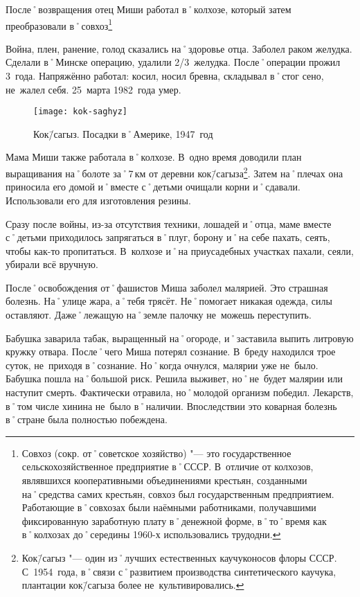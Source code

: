 После˚возвращения отец Миши работал в˚колхозе, который затем преобразовали в˚совхоз\footnote{Совхоз (сокр. от˚советское хозяйство) "--- это государственное сельскохозяйственное предприятие в˚СССР. В~отличие от колхозов, являвшихся кооперативными объединениями крестьян, созданными на˚средства самих крестьян, совхоз был государственным предприятием. Работающие в˚совхозах были наёмными работниками, получавшими фиксированную заработную плату в˚денежной форме, в˚то˚время как в˚колхозах до˚середины 1960-х использовались трудодни.}

Война, плен, ранение, голод сказались на˚здоровье отца. Заболел раком желудка. Сделали в˚Минске операцию, удалили 2/3~желудка. После˚операции прожил 3~года. Напряжённо работал: косил, носил бревна, складывал в˚стог сено, не~жалел себя. 25~марта 1982~года умер.

\begin{wrapfigure}{O}{.4\textwidth}
\centering
\texttt{[image: kok-saghyz]}
\caption[Кок\=/сагыз. Посадки в˚Америке, 1947~год]{Кок\=/сагыз. Посадки в˚Америке, 1947~год\footnotemark}
\label{fig:kok-saghyz}
\end{wrapfigure}

Мама Миши также работала в˚колхозе. В~одно время доводили план выращивания на˚болоте за˚7\,км от деревни кок\=/сагыза\footnote{Кок\=/сагыз "--- один из˚лучших естественных каучуконосов флоры СССР. С~1954~года, в˚связи с˚развитием производства синтетического каучука, плантации кок\=/сагыза более не~культивировались.}. Затем на˚плечах она приносила его домой и˚вместе с˚детьми очищали корни и˚сдавали. Использовали его для изготовления резины.

Сразу после войны, из-за отсутствия техники, лошадей и˚отца, маме вместе с˚детьми приходилось запрягаться в˚плуг, борону и˚на себе пахать, сеять, чтобы как-то пропитаться. В~колхозе и˚на приусадебных участках пахали, сеяли, убирали всё вручную.

После˚освобождения от˚фашистов Миша заболел малярией. Это страшная болезнь. На˚улице жара, а˚тебя трясёт. Не˚помогает никакая одежда, силы оставляют. Даже˚лежащую на˚земле палочку не~можешь переступить. 

Бабушка заварила табак, выращенный на˚огороде, и˚заставила выпить литровую кружку отвара. После˚чего Миша потерял сознание. В~бреду находился трое суток, не~приходя в˚сознание. Но˚когда очнулся, малярии уже не~было. Бабушка пошла на˚большой риск. Решила выживет, но˚не~будет малярии или наступит смерть. Фактически отравила, но˚молодой организм победил. Лекарств, в˚том числе хинина не~было в˚наличии. Впоследствии это коварная болезнь в˚стране была полностью побеждена.

